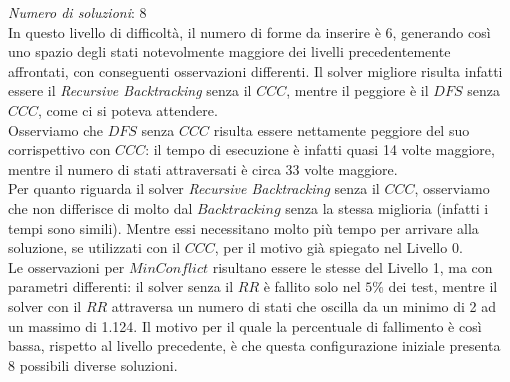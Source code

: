 \textit{Numero di soluzioni}: 8\\

In questo livello di difficoltà, il numero di forme da inserire è 6, generando così uno spazio degli stati notevolmente maggiore dei livelli precedentemente affrontati, con conseguenti osservazioni differenti.
Il solver migliore risulta infatti essere il \textit{Recursive Backtracking} senza il $CCC$, mentre il peggiore è il $DFS$ senza $CCC$, come ci si poteva attendere.\\

Osserviamo che $DFS$ senza $CCC$ risulta essere nettamente peggiore del suo corrispettivo con $CCC$: il tempo di esecuzione è infatti quasi 14 volte maggiore, mentre il numero di stati attraversati è circa 33 volte maggiore.\\

Per quanto riguarda il solver \textit{Recursive Backtracking} senza il $CCC$, osserviamo che non differisce di molto dal $Backtracking$ senza la stessa miglioria (infatti i tempi sono simili). Mentre essi necessitano molto più tempo per arrivare alla soluzione, se utilizzati con il $CCC$, per il motivo già spiegato nel Livello 0.\\

Le osservazioni per $MinConflict$ risultano essere le stesse del Livello 1, ma con parametri differenti: il solver senza il $RR$ è fallito solo nel $5\%$ dei test, mentre il solver con il $RR$ attraversa un numero di stati che oscilla da un minimo di 2 ad un massimo di 1.124. Il motivo per il quale la percentuale di fallimento è così bassa, rispetto al livello precedente, è che questa configurazione iniziale presenta 8 possibili diverse soluzioni.
